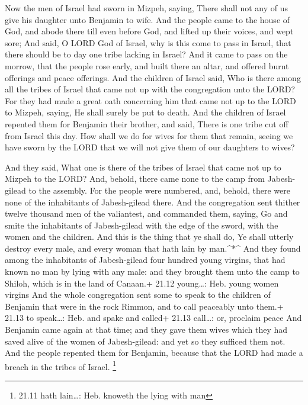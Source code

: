  Now the men of Israel had sworn in Mizpeh, saying, There
shall not any of us give his daughter unto Benjamin to wife.
 And the people came to the house of God, and abode there
till even before God, and lifted up their voices, and wept sore;
 And said, O LORD God of Israel, why is this come to pass in
Israel, that there should be to day one tribe lacking in Israel?
 And it came to pass on the morrow, that the people rose
early, and built there an altar, and offered burnt offerings and peace
offerings.  And the children of Israel said, Who is there
among all the tribes of Israel that came not up with the congregation
unto the LORD? For they had made a great oath concerning him that came
not up to the LORD to Mizpeh, saying, He shall surely be put to death.
 And the children of Israel repented them for Benjamin their
brother, and said, There is one tribe cut off from Israel this day.
 How shall we do for wives for them that remain, seeing we
have sworn by the LORD that we will not give them of our daughters to
wives?

 And they said, What one is there of the tribes of Israel
that came not up to Mizpeh to the LORD? And, behold, there came none to
the camp from Jabesh-gilead to the assembly.  For the people
were numbered, and, behold, there were none of the inhabitants of
Jabesh-gilead there.  And the congregation sent thither
twelve thousand men of the valiantest, and commanded them, saying, Go
and smite the inhabitants of Jabesh-gilead with the edge of the sword,
with the women and the children.  And this is the thing
that ye shall do, Ye shall utterly destroy every male, and every woman
that hath lain by man.\^{}*\^{}  And they found among the
inhabitants of Jabesh-gilead four hundred young virgins, that had known
no man by lying with any male: and they brought them unto the camp to
Shiloh, which is in the land of Canaan.+ 21.12 young\ldots: Heb. young
women virgins  And the whole congregation sent some to
speak to the children of Benjamin that were in the rock Rimmon, and to
call peaceably unto them.+ 21.13 to speak\ldots: Heb. and spake and
called+ 21.13 call\ldots: or, proclaim peace  And Benjamin
came again at that time; and they gave them wives which they had saved
alive of the women of Jabesh-gilead: and yet so they sufficed them not.
 And the people repented them for Benjamin, because that
the LORD had made a breach in the tribes of Israel. \footnote{21.11 hath
  lain\ldots: Heb. knoweth the lying with man}

